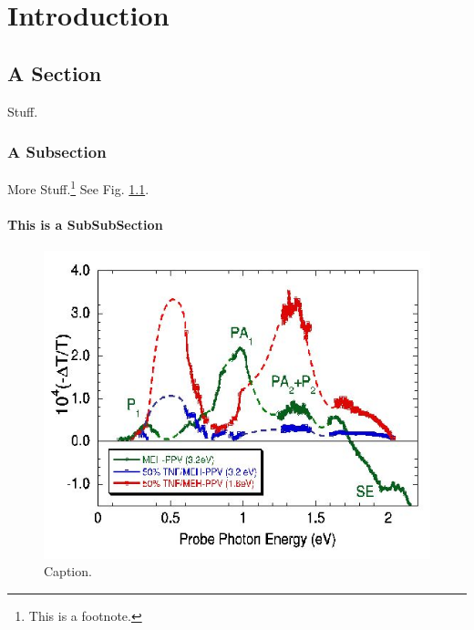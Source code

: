 
\chapter{Introduction}\label{chap1}

\fixchapterheading %
\section{A Section}  %

Stuff.\cite{Holt:2008}

\subsection{A Subsection}   %

More Stuff.\footnote{This is a footnote.} See Fig. \ref{fig:example}.


\subsubsection{This is a SubSubSection}



\begin{figure}[p]
	\begin{center}
    \includegraphics[width=\textwidth]{chap1img/example} 
    \caption{\label{fig:example}Caption.}
    \end{center}
\end{figure}

